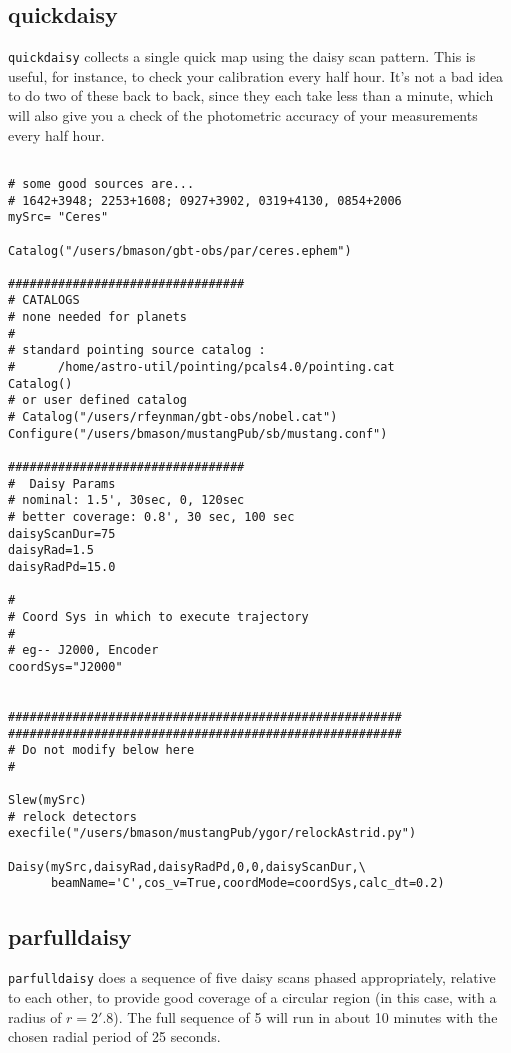 \subsection{quickdaisy}

{\tt quickdaisy} collects a single quick map using the daisy scan
pattern. This is useful, for instance, to check your calibration every
half hour. It's not a bad idea to do two of these back to back, since
they each take less than a minute, which will also give you a check of
the photometric accuracy of your measurements every half hour.

\begin{lstlisting}

# some good sources are...
# 1642+3948; 2253+1608; 0927+3902, 0319+4130, 0854+2006
mySrc= "Ceres"

Catalog("/users/bmason/gbt-obs/par/ceres.ephem")

#################################
# CATALOGS
# none needed for planets
#
# standard pointing source catalog :
#      /home/astro-util/pointing/pcals4.0/pointing.cat
Catalog()
# or user defined catalog
# Catalog("/users/rfeynman/gbt-obs/nobel.cat")
Configure("/users/bmason/mustangPub/sb/mustang.conf")

#################################
#  Daisy Params
# nominal: 1.5', 30sec, 0, 120sec
# better coverage: 0.8', 30 sec, 100 sec
daisyScanDur=75
daisyRad=1.5
daisyRadPd=15.0

#
# Coord Sys in which to execute trajectory
#
# eg-- J2000, Encoder
coordSys="J2000"


#######################################################
#######################################################
# Do not modify below here
#

Slew(mySrc)							       
# relock detectors
execfile("/users/bmason/mustangPub/ygor/relockAstrid.py")

Daisy(mySrc,daisyRad,daisyRadPd,0,0,daisyScanDur,\
      beamName='C',cos_v=True,coordMode=coordSys,calc_dt=0.2)

\end{lstlisting}

\subsection{parfulldaisy}

{\tt parfulldaisy} does a sequence of five daisy scans phased appropriately, relative
to each other, to provide good coverage of a circular region (in this case, with
a radius of $r=2'.8$). The full sequence of 5 will run in about 10 minutes with the
chosen radial period of 25 seconds.

